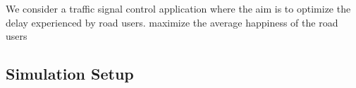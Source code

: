 We consider a traffic signal control application where the aim is to optimize the delay experienced by road users. maximize the average happiness of the road users

\subsection{Simulation Setup}  
%
